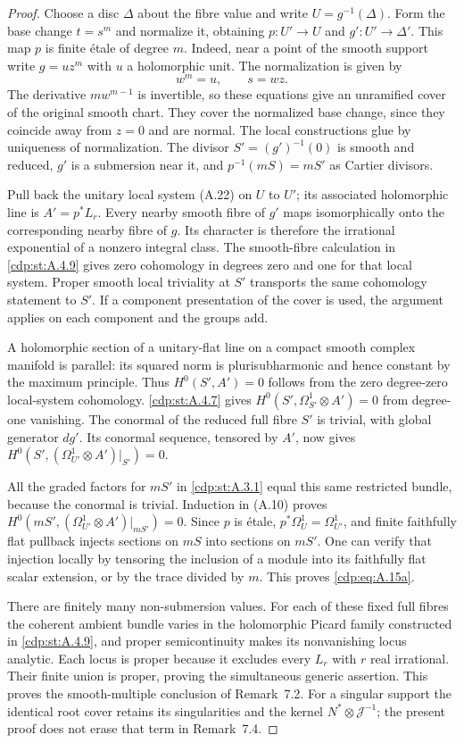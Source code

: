 \begin{proof}
Choose a disc $\Delta$ about the fibre value and write $U=g^{-1}(\Delta)$. Form the base change $t=s^m$ and normalize it, obtaining $p:U'\to U$ and $g':U'\to\Delta'$. This map $p$ is finite étale of degree $m$. Indeed, near a point of the smooth support write $g=u z^m$ with $u$ a holomorphic unit. The normalization is given by
\[
 w^m=u,\qquad s=wz.
\]
The derivative $m w^{m-1}$ is invertible, so these equations give an unramified cover of the original smooth chart. They cover the normalized base change, since they coincide away from $z=0$ and are normal. The local constructions glue by uniqueness of normalization. The divisor $S'=(g')^{-1}(0)$ is smooth and reduced, $g'$ is a submersion near it, and $p^{-1}(mS)=mS'$ as Cartier divisors.

Pull back the unitary local system (A.22) on $U$ to $U'$; its associated holomorphic line is $A'=p^*L_r$. Every nearby smooth fibre of $g'$ maps isomorphically onto the corresponding nearby fibre of $g$. Its character is therefore the irrational exponential of a nonzero integral class. The smooth-fibre calculation in \ref{cdp:st:A.4.9} gives zero cohomology in degrees zero and one for that local system. Proper smooth local triviality at $S'$ transports the same cohomology statement to $S'$. If a component presentation of the cover is used, the argument applies on each component and the groups add.

A holomorphic section of a unitary-flat line on a compact smooth complex manifold is parallel: its squared norm is plurisubharmonic and hence constant by the maximum principle. Thus $H^0(S',A')=0$ follows from the zero degree-zero local-system cohomology. \ref{cdp:st:A.4.7} gives $H^0(S',\Omega_{S'}^1\otimes A')=0$ from degree-one vanishing. The conormal of the reduced full fibre $S'$ is trivial, with global generator $dg'$. Its conormal sequence, tensored by $A'$, now gives
$H^0(S',(\Omega_{U'}^1\otimes A')|_{S'})=0$.

All the graded factors for $mS'$ in \ref{cdp:st:A.3.1} equal this same restricted bundle, because the conormal is trivial. Induction in (A.10) proves $H^0(mS',(\Omega_{U'}^1\otimes A')|_{mS'})=0$. Since $p$ is étale, $p^*\Omega_U^1=\Omega_{U'}^1$, and finite faithfully flat pullback injects sections on $mS$ into sections on $mS'$. One can verify that injection locally by tensoring the inclusion of a module into its faithfully flat scalar extension, or by the trace divided by $m$. This proves \eqref{cdp:eq:A.15a}.

There are finitely many non-submersion values. For each of these fixed full fibres the coherent ambient bundle varies in the holomorphic Picard family constructed in \ref{cdp:st:A.4.9}, and proper semicontinuity makes its nonvanishing locus analytic. Each locus is proper because it excludes every $L_r$ with $r$ real irrational. Their finite union is proper, proving the simultaneous generic assertion. This proves the smooth-multiple conclusion of Remark~7.2. For a singular support the identical root cover retains its singularities and the kernel $N^*\otimes\mathcal J^{-1}$; the present proof does not erase that term in Remark~7.4.
\end{proof}
